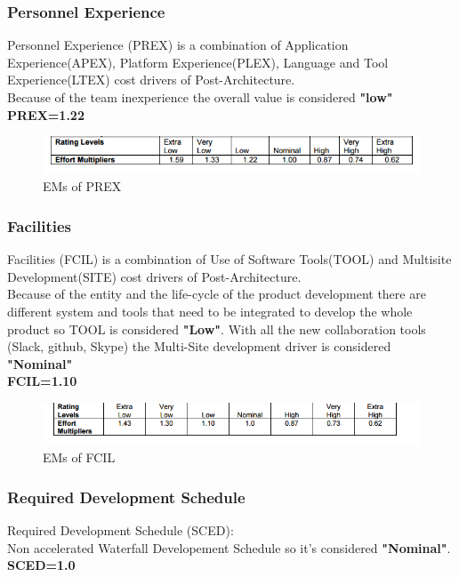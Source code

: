 \subsubsection{Personnel Experience}		
{Personnel Experience (PREX) is a combination of Application Experience(APEX), Platform Experience(PLEX), Language and Tool Experience(LTEX) cost drivers of Post-Architecture. 
			\\
			Because of the team inexperience the overall value is considered \textbf{"low" }
			\\
			\textbf{PREX=1.22}
		\begin{figure}[H] 
			\centering
			\includegraphics[scale = 0.6]{img/PREX.png}
			\caption{EMs of PREX}
		\end{figure}

\subsubsection{Facilities }		
Facilities (FCIL) is a combination of Use of Software Tools(TOOL) and Multisite Development(SITE) cost drivers of Post-Architecture. 
		\\
		Because of the entity and the life-cycle of the product development there are different system and tools that need to be integrated to develop the whole product so TOOL is considered \textbf{"Low"}.
		With all the new collaboration tools (Slack, github, Skype) the Multi-Site development driver is considered \textbf{"Nominal"}
		\\
		\textbf{FCIL=1.10}
		\begin{figure}[H] 
			\centering
			\includegraphics[scale = 0.6]{img/FCIL.png}
			\caption{EMs of FCIL}
		\end{figure}

\subsubsection{Required Development Schedule }		
	Required Development Schedule (SCED):
		\\
		Non accelerated Waterfall Developement Schedule so it's considered \textbf{"Nominal"}.
		\\
		\textbf{SCED=1.0}
		
}
